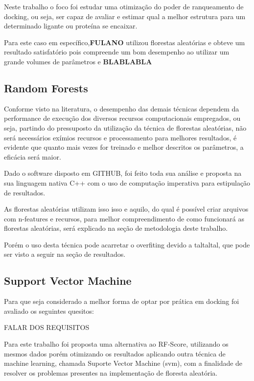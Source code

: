 \documentclass[tcc, capa]{texucpel}
\begin{document}

Neste trabalho o foco foi estudar uma otimização do poder de ranqueamento de docking, ou seja, ser capaz de avaliar e estimar qual a melhor estrutura para um determinado ligante ou proteína se encaixar.

Para este caso em específico,\textbf{FULANO} utilizou florestas aleatórias e obteve um resultado satisfatório pois compreende um bom desempenho ao utilizar um grande volumes de parâmetros e  \textbf{BLABLABLA}

\subsection{Random Forests}
Conforme visto na literatura, o desempenho das demais técnicas dependem da performance de execução dos diversos recursos computacionais empregados, ou seja, partindo do pressuposto da utilização da técnica de florestas aleatórias, não será necessários exímios recursos e processamento para melhores resultados, é evidente que quanto mais vezes for treinado e melhor descritos os parâmetros, a eficácia será maior.

Dado o software disposto em GITHUB, foi feito toda sua análise e proposta na sua linguagem nativa C++ com o uso de computação imperativa para estipulação de resultados.

As florestas aleatórias utilizam isso isso e aquilo, do qual é possível criar arquivos com n-features e recursos, para melhor compreendimento de como funcionará as florestas aleatórias, será explicado na seção de metodologia deste trabalho. 

Porém o uso desta técnica pode acarretar o overfiting devido a taltaltal, que pode ser visto a seguir na seção de resultados.

\subsection{Support Vector Machine}

Para que seja considerado a melhor forma de optar por prática em docking foi avaliado os seguintes quesitos:

FALAR DOS REQUISITOS

Para este trabalho foi proposta uma alternativa ao RF-Score, utilizando os mesmos dados porém otimizando os resultados aplicando outra técnica de machine learning, chamada Suporte Vector Machine (svm), com a finalidade de resolver os problemas presentes na implementação de floresta aleatória.
\end{document}
